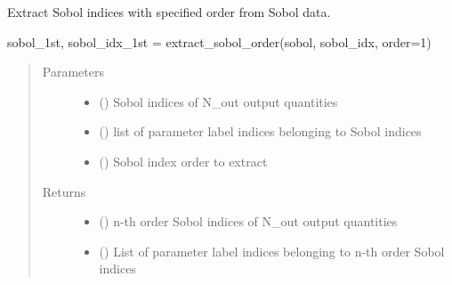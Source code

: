 \documentclass[letterpaper,10pt,english,openany,oneside]{sphinxmanual}
\begin{document}
\begin{fulllineitems}
\label{\detokenize{pygpc:pygpc.postproc.get_extracted_sobol_order}}
Extract Sobol indices with specified order from Sobol data.

sobol\_1st, sobol\_idx\_1st = extract\_sobol\_order(sobol, sobol\_idx, order=1)
\begin{quote}\begin{description}
\item[{Parameters}] \leavevmode\begin{itemize}
\item {} 
 (\sphinxstyleliteralemphasis{\sphinxupquote{{[}}}\sphinxstyleliteralemphasis{\sphinxupquote{{]} }}) \textendash{} Sobol indices of N\_out output quantities

\item {} 
 (\sphinxstyleliteralemphasis{\sphinxupquote{{[}}}\sphinxstyleliteralemphasis{\sphinxupquote{{]} }}) \textendash{} list of parameter label indices belonging to Sobol indices

\item {} 
 (\sphinxstyleliteralemphasis{\sphinxupquote{, }}\sphinxstyleliteralemphasis{\sphinxupquote{, }}) \textendash{} Sobol index order to extract

\end{itemize}

\item[{Returns}] \leavevmode
\begin{itemize}
\item {} 
 () \textendash{} n-th order Sobol indices of N\_out output quantities

\item {} 
 () \textendash{} List of parameter label indices belonging to n-th order Sobol indices

\end{itemize}


\end{description}\end{quote}

\end{fulllineitems}
\end{document}

